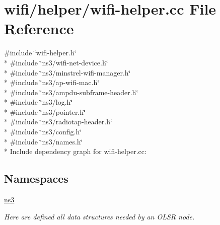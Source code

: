 \hypertarget{wifi-helper_8cc}{}\section{wifi/helper/wifi-\/helper.cc File Reference}
\label{wifi-helper_8cc}
{\ttfamily \#include \char`\"{}wifi-\/helper.\+h\char`\"{}}\\*
{\ttfamily \#include \char`\"{}ns3/wifi-\/net-\/device.\+h\char`\"{}}\\*
{\ttfamily \#include \char`\"{}ns3/minstrel-\/wifi-\/manager.\+h\char`\"{}}\\*
{\ttfamily \#include \char`\"{}ns3/ap-\/wifi-\/mac.\+h\char`\"{}}\\*
{\ttfamily \#include \char`\"{}ns3/ampdu-\/subframe-\/header.\+h\char`\"{}}\\*
{\ttfamily \#include \char`\"{}ns3/log.\+h\char`\"{}}\\*
{\ttfamily \#include \char`\"{}ns3/pointer.\+h\char`\"{}}\\*
{\ttfamily \#include \char`\"{}ns3/radiotap-\/header.\+h\char`\"{}}\\*
{\ttfamily \#include \char`\"{}ns3/config.\+h\char`\"{}}\\*
{\ttfamily \#include \char`\"{}ns3/names.\+h\char`\"{}}\\*
Include dependency graph for wifi-\/helper.cc\+:
\subsection*{Namespaces}
\begin{DoxyCompactItemize}
\item 
 \hyperlink{namespacens3}{ns3}
\begin{DoxyCompactList}\small\item\em Here are defined all data structures needed by an O\+L\+SR node. \end{DoxyCompactList}\end{DoxyCompactItemize}
